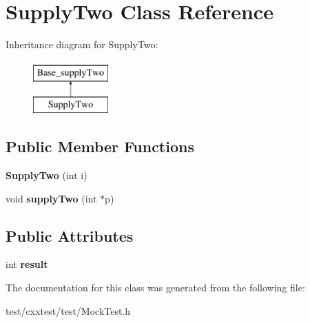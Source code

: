 \hypertarget{classSupplyTwo}{\section{Supply\-Two Class Reference}
\label{classSupplyTwo}
}
Inheritance diagram for Supply\-Two\-:\begin{figure}[H]
\begin{center}
\leavevmode
\includegraphics[height=2.000000cm]{classSupplyTwo}
\end{center}
\end{figure}
\subsection*{Public Member Functions}
\begin{DoxyCompactItemize}
\item 
\hypertarget{classSupplyTwo_a9257beadb1eb230bdc320b064ecbe733}{{\bfseries Supply\-Two} (int i)}\label{classSupplyTwo_a9257beadb1eb230bdc320b064ecbe733}

\item 
\hypertarget{classSupplyTwo_aca758f5b8ea16b0a17e900c2bf478b5c}{void {\bfseries supply\-Two} (int $\ast$p)}\label{classSupplyTwo_aca758f5b8ea16b0a17e900c2bf478b5c}

\end{DoxyCompactItemize}
\subsection*{Public Attributes}
\begin{DoxyCompactItemize}
\item 
\hypertarget{classSupplyTwo_a04ef4436e3c09a95819448414df156d4}{int {\bfseries result}}\label{classSupplyTwo_a04ef4436e3c09a95819448414df156d4}

\end{DoxyCompactItemize}


The documentation for this class was generated from the following file\-:\begin{DoxyCompactItemize}
\item 
test/cxxtest/test/Mock\-Test.\-h\end{DoxyCompactItemize}
